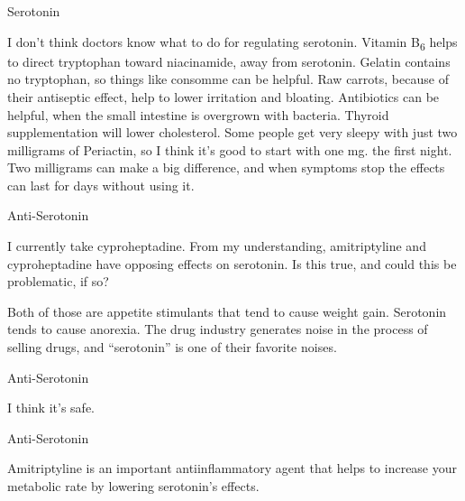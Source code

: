 \documentclass[11pt,oneside,openany,extrafontsizes]{memoir}
\begin{document}
\begin{standalonequote}{Serotonin}

    \begin{answer}
        I don't think doctors know what to do for regulating serotonin. Vitamin B\textsubscript{6} helps to direct tryptophan toward niacinamide, away from serotonin. Gelatin contains no tryptophan, so things like consomme can be helpful. Raw carrots, because of their antiseptic effect, help to lower irritation and bloating. Antibiotics can be helpful, when the small intestine is overgrown with bacteria. Thyroid supplementation will lower cholesterol. Some people get very sleepy with just two milligrams of Periactin, so I think it's good to start with one mg. the first night. Two milligrams can make a big difference, and when symptoms stop the effects can last for days without using it.
    \end{answer}
\end{standalonequote}

\begin{qaexchange}{Anti-Serotonin}

    \begin{question}
        I currently take cyproheptadine. From my understanding, amitriptyline and cyproheptadine have opposing effects on serotonin. Is this true, and could this be problematic, if so?
    \end{question}

    \begin{answer}
        Both of those are appetite stimulants that tend to cause weight gain. Serotonin tends to cause anorexia. The drug industry generates noise in the process of selling drugs, and \enquote{serotonin} is one of their favorite noises.
    \end{answer}
\end{qaexchange}

\begin{standalonequote}{Anti-Serotonin}

    \begin{answer}
        I think it's safe.
    \end{answer}
\end{standalonequote}

\begin{standalonequote}{Anti-Serotonin}

    \begin{answer}
        Amitriptyline is an important antiinflammatory agent that helps to increase your metabolic rate by lowering serotonin's effects.
    \end{answer}
\end{standalonequote}
\end{document}
